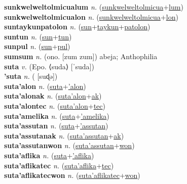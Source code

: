 \textbf{sunkwelweltolmicualum} \textit{n.} (\hyperref[sunkwelweltolmicua]{sunkwelweltolmicua}+\hyperref[lum]{lum})
 \label{sunkwelweltolmicualum} \\
\textbf{sunkwelweltolmicualon} \textit{n.} (\hyperref[sunkwelweltolmicua]{sunkwelweltolmicua}+\hyperref[lon]{lon})
 \label{sunkwelweltolmicualon} \\
\textbf{suntaykunpatolon} \textit{n.} (\hyperref[sun]{sun}+\hyperref[taykun]{taykun}+\hyperref[patolon]{patolon})
 \label{suntaykunpatolon} \\
\textbf{suntun} \textit{n.} (\hyperref[sun]{sun}+\hyperref[tun]{tun})
 \label{suntun} \\
\textbf{sunpul} \textit{n.} (\hyperref[sun]{sun}+\hyperref[pul]{pul})
 \label{sunpul} \\
\textbf{sumsum} \textit{n.} (ono. [zum zum])
abeja; Anthophilia \label{sumsum} \\
\textbf{suta} \textit{v.} (Epo. ⟨suda⟩ [ˈsuda])
 \label{suta} \\
\textbf{'suta} \textit{n.} ( [suɖə])
 \label{'suta} \\
\textbf{suta'alon} \textit{n.} (\hyperref[suta]{suta}+\hyperref['alon]{'alon})
 \label{suta'alon} \\
\textbf{suta'alonak} \textit{n.} (\hyperref[suta'alon]{suta'alon}+\hyperref[ak]{ak})
 \label{suta'alonak} \\
\textbf{suta'alontec} \textit{n.} (\hyperref[suta'alon]{suta'alon}+\hyperref[tec]{tec})
 \label{suta'alontec} \\
\textbf{suta'amelika} \textit{n.} (\hyperref[suta]{suta}+\hyperref['amelika]{'amelika})
 \label{suta'amelika} \\
\textbf{suta'assutan} \textit{n.} (\hyperref[suta]{suta}+\hyperref['assutan]{'assutan})
 \label{suta'assutan} \\
\textbf{suta'assutanak} \textit{n.} (\hyperref[suta'assutan]{suta'assutan}+\hyperref[ak]{ak})
 \label{suta'assutanak} \\
\textbf{suta'assutanwon} \textit{n.} (\hyperref[suta'assutan]{suta'assutan}+\hyperref[won]{won})
 \label{suta'assutanwon} \\
\textbf{suta'aflika} \textit{n.} (\hyperref[suta]{suta}+\hyperref['aflika]{'aflika})
 \label{suta'aflika} \\
\textbf{suta'aflikatec} \textit{n.} (\hyperref[suta'aflika]{suta'aflika}+\hyperref[tec]{tec})
 \label{suta'aflikatec} \\
\textbf{suta'aflikatecwon} \textit{n.} (\hyperref[suta'aflikatec]{suta'aflikatec}+\hyperref[won]{won})
